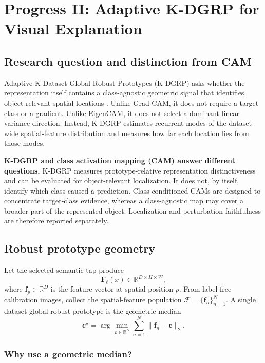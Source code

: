 \section{Progress II: Adaptive K-DGRP for Visual Explanation}
\label{sec:kdgrp}

\subsection{Research question and distinction from CAM}

Adaptive K Dataset-Global Robust Prototypes (K-DGRP) asks whether the
representation itself contains a class-agnostic geometric signal that identifies
object-relevant spatial locations \cite{chan2026kdgrp}. Unlike Grad-CAM, it does
not require a target class or a gradient. Unlike EigenCAM, it does not select a
dominant linear variance direction. Instead, K-DGRP estimates recurrent modes
of the dataset-wide spatial-feature distribution and measures how far each
location lies from those modes.

\textbf{K-DGRP and class activation mapping (CAM) answer different questions.}
K-DGRP measures prototype-relative representation distinctiveness and can be
evaluated for object-relevant localization. It does not, by itself, identify
which class caused a prediction. Class-conditioned CAMs are designed to
concentrate target-class evidence, whereas a class-agnostic map may cover a
broader part of the represented object. Localization and perturbation
faithfulness are therefore reported separately.

\subsection{Robust prototype geometry}

Let the selected semantic tap produce
\begin{equation}
    \bm F_\ell(x)\in\mathbb{R}^{D\times H\times W},
\end{equation}
where $\bm f_p\in\mathbb{R}^D$ is the feature vector at spatial position $p$.
From label-free calibration images, collect the spatial-feature population
$\mathcal{F}=\{\bm f_n\}_{n=1}^N$. A single dataset-global robust prototype is
the geometric median
\begin{equation}
    \boxed{
    \bm c^\star
    =\arg\min_{\bm c\in\mathbb{R}^D}
      \sum_{n=1}^N\|\bm f_n-\bm c\|_2.}
    \label{eq:dgrp-median}
\end{equation}

\subsubsection{Why use a geometric median?}

